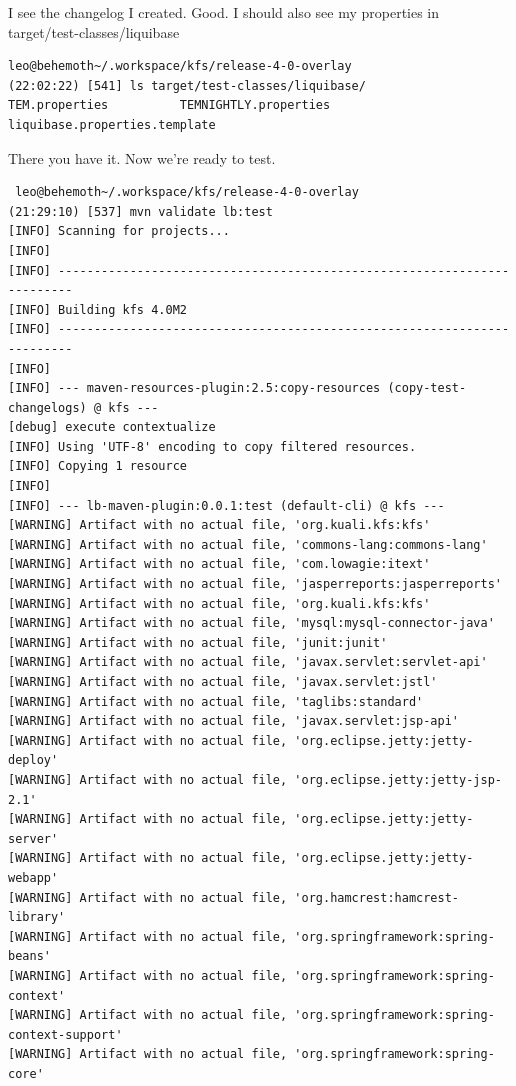 \documentclass[12pt,notitlepage]{article}
\begin{document}
I see the changelog I created. Good. I should also see my properties
in target/test-classes/liquibase

\begin{lstlisting}
leo@behemoth~/.workspace/kfs/release-4-0-overlay
(22:02:22) [541] ls target/test-classes/liquibase/
TEM.properties          TEMNIGHTLY.properties
liquibase.properties.template
\end{lstlisting}

There you have it. Now we're ready to test.

\begin{lstlisting}
 leo@behemoth~/.workspace/kfs/release-4-0-overlay
(21:29:10) [537] mvn validate lb:test
[INFO] Scanning for projects...
[INFO]                                                                        
[INFO] ------------------------------------------------------------------------
[INFO] Building kfs 4.0M2
[INFO] ------------------------------------------------------------------------
[INFO]
[INFO] --- maven-resources-plugin:2.5:copy-resources (copy-test-changelogs) @ kfs ---
[debug] execute contextualize
[INFO] Using 'UTF-8' encoding to copy filtered resources.
[INFO] Copying 1 resource
[INFO]
[INFO] --- lb-maven-plugin:0.0.1:test (default-cli) @ kfs ---
[WARNING] Artifact with no actual file, 'org.kuali.kfs:kfs'
[WARNING] Artifact with no actual file, 'commons-lang:commons-lang'
[WARNING] Artifact with no actual file, 'com.lowagie:itext'
[WARNING] Artifact with no actual file, 'jasperreports:jasperreports'
[WARNING] Artifact with no actual file, 'org.kuali.kfs:kfs'
[WARNING] Artifact with no actual file, 'mysql:mysql-connector-java'
[WARNING] Artifact with no actual file, 'junit:junit'
[WARNING] Artifact with no actual file, 'javax.servlet:servlet-api'
[WARNING] Artifact with no actual file, 'javax.servlet:jstl'
[WARNING] Artifact with no actual file, 'taglibs:standard'
[WARNING] Artifact with no actual file, 'javax.servlet:jsp-api'
[WARNING] Artifact with no actual file, 'org.eclipse.jetty:jetty-deploy'
[WARNING] Artifact with no actual file, 'org.eclipse.jetty:jetty-jsp-2.1'
[WARNING] Artifact with no actual file, 'org.eclipse.jetty:jetty-server'
[WARNING] Artifact with no actual file, 'org.eclipse.jetty:jetty-webapp'
[WARNING] Artifact with no actual file, 'org.hamcrest:hamcrest-library'
[WARNING] Artifact with no actual file, 'org.springframework:spring-beans'
[WARNING] Artifact with no actual file, 'org.springframework:spring-context'
[WARNING] Artifact with no actual file, 'org.springframework:spring-context-support'
[WARNING] Artifact with no actual file, 'org.springframework:spring-core'

\end{lstlisting}
\end{document}
